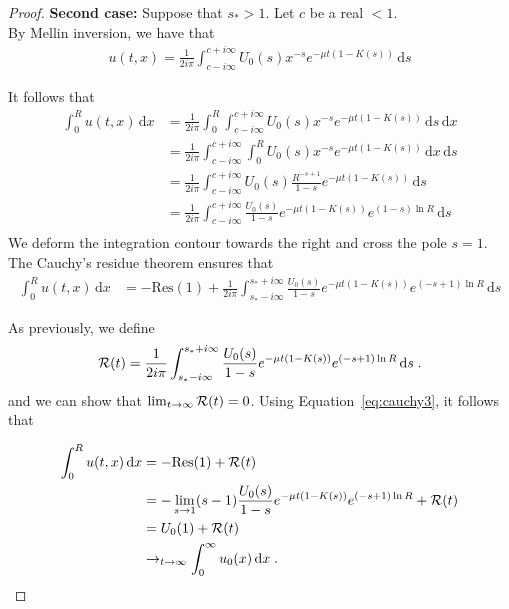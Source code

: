 \documentclass[11pt]{amsart}
\newcommand{\diff}{\,\mathrm{d}}
\begin{document}
\begin{proof}
\textbf{Second case:} Suppose that $s_* > 1$. Let $c$ be a real $<1$. \\
By Mellin inversion, we have that
\begin{align*}
    u(t,x) = \frac{1}{2i\pi}\int_{c-i\infty}^{c+i\infty} U_0(s) x^{-s} e^{-\mu t(1 - K(s))} \diff s
\end{align*}

It follows that
\begin{align*}
    \int_0^R u(t,x) \diff x 
    &= \frac{1}{2i\pi} \int_0^R \int_{c-i\infty}^{c+i\infty} U_0(s) x^{-s} e^{-\mu t(1 - K(s))} \diff s \diff x \\
    &= \frac{1}{2i\pi} \int_{c-i\infty}^{c+i\infty} \int_0^R U_0(s) x^{-s} e^{-\mu t(1 - K(s))} \diff x \diff s \\
    &= \frac{1}{2i\pi} \int_{c-i\infty}^{c+i\infty} U_0(s) \frac{R^{-s+1}}{1-s} e^{-\mu t(1 - K(s))} \diff s \\
    &= \frac{1}{2i\pi} \int_{c-i\infty}^{c+i\infty} \frac{U_0(s)}{1-s} e^{-\mu t(1 - K(s))} e^{(1-s)\ln R} \diff s \\
\end{align*}
We deform the integration contour towards the right and cross the pole $s = 1$. The Cauchy's residue theorem ensures that
\begin{align}
    \int_0^R u(t,x) \diff x &= -\mathrm{Res(1)} + \frac{1}{2i\pi} \int_{s_*-i\infty}^{s_*+i\infty} \frac{U_0(s)}{1-s} e^{-\mu t(1 - K(s))} e^{(-s+1)\ln R} \diff s
    \label{eq:cauchy3}
\end{align}

As previously, we define
\begin{align*}
    \Rcal(t) = \frac{1}{2i\pi} \int_{s_*-i\infty}^{s_*+i\infty} \frac{U_0(s)}{1-s} e^{-\mu t(1 - K(s))} e^{(-s+1)\ln R} \diff s
    \eqfinp
\end{align*}
and we can show that $\lim_{t\to\infty}\mathcal{R}(t) = 0$. Using Equation~\ref{eq:cauchy3}, it follows that 

\begin{align*}
    \int_0^R u(t,x) \diff x &= -\mathrm{Res(1)} + \Rcal(t) \\
    &= -\lim_{s \to 1} (s-1)\frac{U_0(s)}{1-s} e^{-\mu t(1 - K(s))} e^{(-s+1)\ln R}  + \Rcal(t)\\
    &= U_0(1) + \Rcal(t)\\
    &\to_{t \to \infty} \int_0^\infty u_0(x) \diff x
    \eqfinp
\end{align*}
\end{proof}
\end{document}
